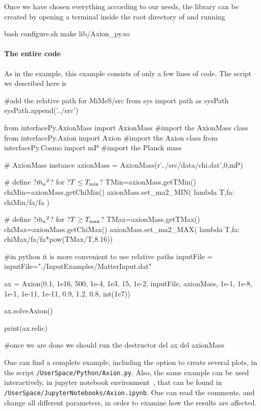 \documentclass[11pt,a4paper]{article}
\begin{document}
Once we have chosen everything according to our needs, the library can be created by opening a terminal inside the root directory of \mimes and running
%
\begin{py}
	bash configure.sh
	make lib/Axion_py.so
\end{py}
%

\paragraph{The entire code}
%
As in the \CPP example, this example consists of only a few lines of code. The script we described here is
%
\begin{py}
	#add the relative path for MiMeS/src
	from sys import path as sysPath
	sysPath.append('../src')	
	
	from interfacePy.AxionMass import AxionMass #import the AxionMass class
	from interfacePy.Axion import Axion #import the Axion class
	from interfacePy.Cosmo import mP #import the Planck mass

	# AxionMass instance
	axionMass = AxionMass(r'../src/data/chi.dat',0,mP)
	
	# define ?$\tilde m_{a}{}^2$? for ?$T\leq T_{\rm min}$?
	TMin=axionMass.getTMin() 
	chiMin=axionMass.getChiMin()
	axionMass.set_ma2_MIN( lambda T,fa: chiMin/fa/fa )

	# define ?$\tilde m_{a}{}^2$? for ?$T\geq T_{\rm max}$?
	TMax=axionMass.getTMax() 
	chiMax=axionMass.getChiMax()
	axionMass.set_ma2_MAX( lambda T,fa: chiMax/fa/fa*pow(TMax/T,8.16))
	
	#in python it is more convenient to use relative paths
	inputFile = inputFile="./InputExamples/MatterInput.dat"  
	
	ax = Axion(0.1, 1e16, 500, 1e-4, 1e3, 15, 1e-2, inputFile, axionMass, 
					1e-1, 1e-8, 1e-1, 1e-11, 1e-11, 0.9, 1.2, 0.8, int(1e7))

	ax.solveAxion()
	
	print(ax.relic)
	
	#once we are done we should run the destructor
	del ax
	del axionMass
\end{py} 


One can find a complete example, including the option to create several plots, in the script {\tt \mimes/UserSpace/Python/Axion.py}. Also, the same example can be used interactively, in jupyter notebook environment~\cite{Kluyver2016jupyter}, that can be found in {\tt \mimes/UserSpace/JupyterNotebooks/Axion.ipynb}. One can read the comments, and change all different parameters, in order to examine how the results are affected. 
\end{document}
